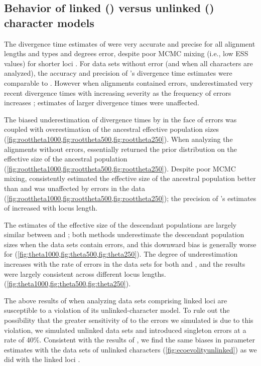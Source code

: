 \subsection{Behavior of linked (\beast) versus unlinked (\ecoevolity) character
    models}
The divergence time estimates of \beast were very accurate and precise for all
alignment lengths and types and degrees error, despite poor MCMC mixing (i.e.,
low ESS values) for shorter loci \timefigsp. 
For data sets without error (and when all characters are analyzed), the
accuracy and precision of \ecoevolity's divergence time estimates were
comparable to \beast \timefigsp.
However when alignments contained errors, \ecoevolity underestimated very
recent divergence times with increasing severity as the frequency of errors
increases \timefigsp; estimates of larger divergence times were unaffected.

The biased underestimation of divergence times by \ecoevolity in the face of
errors was coupled with overestimation of the ancestral effective population
sizes (\cref{fig:roottheta1000,fig:roottheta500,fig:roottheta250}).
When analyzing the alignments without errors, \ecoevolity essentially returned
the prior distribution on the effective size of the ancestral population
(\cref{fig:roottheta1000,fig:roottheta500,fig:roottheta250}).
Despite poor MCMC mixing, \beast consistently estimated the effective size of
the ancestral population better than \ecoevolity and was unaffected by errors
in the data
(\cref{fig:roottheta1000,fig:roottheta500,fig:roottheta250});
the precision of \beast's estimates of \rootpopsize increased with locus
length.

The estimates of the effective size of the descendant populations
are largely similar between \beast and \ecoevolity;
both methods underestimate the descendant population sizes when
the data sets contain errors, and this downward bias is generally
worse for \ecoevolity
(\cref{fig:theta1000,fig:theta500,fig:theta250}).
The degree of underestimation increases with the rate of errors in the data
sets for both \beast and \ecoevolity, and the results were largely consistent
across different locus lengths.
(\cref{fig:theta1000,fig:theta500,fig:theta250}).

The above results of \ecoevolity when analyzing data sets comprising linked
loci are susceptible to a violation of its unlinked-character model.
To rule out the possibility that the greater sensitivity of \ecoevolity to the
errors we simulated is due to this violation, we simulated unlinked data sets
and introduced singleton errors at a rate of 40\%.
Consistent with the results of \citet{Oaks2018ecoevolity}, we find the same
biases in parameter estimates with the data sets of unlinked characters
(\cref{fig:ecoevolityunlinked}) as we did with the linked loci \timefigsp.

